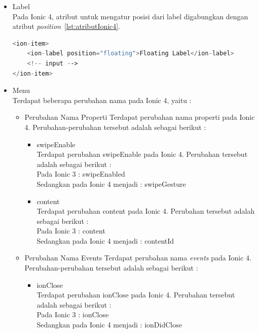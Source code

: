 \begin{enumerate}
\begin{enumerate}
\begin{itemize}
\begin{itemize}
				\item Label \\
				Pada Ionic 4, atribut untuk mengatur posisi dari label digabungkan dengan atribut {\it position}~\ref{lst:atributIonic4}.
				\begin{lstlisting}[language=php, label={lst:atributIonic4}, caption=Penggunaan Atribut {\it Position} pada Ionic 4]
<ion-item>
	<ion-label position="floating">Floating Label</ion-label>
	<!-- input -->
</ion-item>
				\end{lstlisting}

				\item Menu \\
				Terdapat beberapa perubahan nama pada Ionic 4, yaitu :
				\begin{itemize}
					\item Perubahan Nama Properti
					Terdapat perubahan nama properti pada Ionic 4. Perubahan-perubahan tersebut adalah sebagai berikut : 
						\begin{itemize}
							\item swipeEnable \\
							Terdapat perubahan swipeEnable pada Ionic 4. Perubahan tersebut adalah sebagai berikut : \\
							Pada Ionic 3 : swipeEnabled \\
							Sedangkan pada Ionic 4 menjadi : swipeGesture

							\item content \\
							Terdapat perubahan content pada Ionic 4. Perubahan tersebut adalah sebagai berikut : \\
							Pada Ionic 3 : content \\
							Sedangkan pada Ionic 4 menjadi : contentId
						\end{itemize}	
					

					\item Perubahan Nama Events
					Terdapat perubahan nama {\it events} pada Ionic 4. Perubahan-perubahan tersebut adalah sebagai berikut :
						\begin{itemize}
							\item ionClose \\
							Terdapat perubahan ionClose pada Ionic 4. Perubahan tersebut adalah sebagai berikut : \\
							Pada Ionic 3 : ionClose \\
							Sedangkan pada Ionic 4 menjadi : ionDidClose


\end{itemize}
\end{itemize}
\end{itemize}
\end{itemize}
\end{enumerate}
\end{enumerate}
